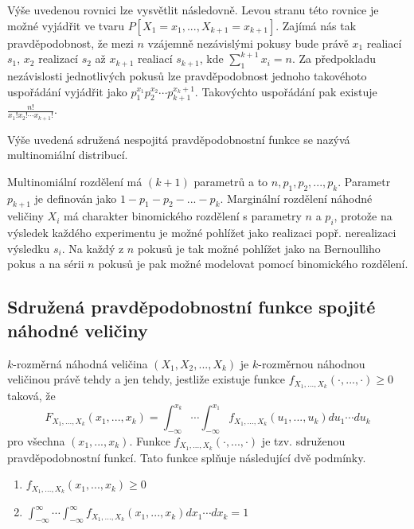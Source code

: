 Výše uvedenou rovnici lze vysvětlit následovně. Levou stranu této rovnice je možné vyjádřit ve tvaru $P[X_1 = x_1, ..., X_{k + 1} = x_{k + 1}]$. Zajímá nás tak pravděpodobnost, že mezi $n$ vzájemně nezávislými pokusy bude právě $x_1$ realiací $s_1$,  $x_2$ realizací $s_2$ až $x_{k + 1}$ realiací $s_{k + 1}$, kde $\sum_1^{k+1}x_i = n$. Za předpokladu nezávislosti jednotlivých pokusů lze pravděpodobnost jednoho takovéhoto uspořádání vyjádřit jako $p_1^{x_1}p_2^{x_2} \cdots p_{k+1}^{x_k + 1}$. Takovýchto uspořádání pak existuje $\frac{n!}{x_1!x_2! \cdots x_{k+1}!}$.

\begin{definition}
Výše uvedená sdružená nespojitá pravděpodobnostní funkce se nazývá multinomiální distribucí.
\end{definition}

Multinomiální rozdělení má $(k + 1)$ parametrů a to $n, p_1, p_2, ..., p_k$. Parametr $p_{k+1}$ je definován jako $1 - p_1 - p_2 - ... - p_k$. Marginální rozdělení náhodné veličiny $X_i$ má charakter binomického rozdělení s parametry $n$ a $p_i$, protože na výsledek každého experimentu je možné pohlížet jako realizaci popř. nerealizaci výsledku $s_i$. Na každý z $n$ pokusů je tak možné pohlížet jako na Bernoulliho pokus a na sérii $n$ pokusů je pak možné modelovat pomocí binomického rozdělení.

\subsection{Sdružená pravděpodobnostní funkce spojité náhodné veličiny}

\begin{definition}
$k$-rozměrná náhodná veličina $(X_1, X_2, ..., X_k)$ je $k$-rozměrnou náhodnou veličinou právě tehdy a jen tehdy, jestliže existuje funkce $f_{X_1, ..., X_k}(\cdot, ..., \cdot) \ge 0$ taková, že
\begin{equation*}
F_{X_1, ..., X_k}(x_1, ..., x_k) = \int_{-\infty}^{x_k} \cdots \int_{-\infty}^{x_1} f_{X_1, ..., X_k}(u_1, ..., u_k)du_1 \cdots du_k
\end{equation*}
pro všechna $(x_1, ..., x_k)$. Funkce $f_{X_1, ..., X_k}(\cdot, ..., \cdot)$ je tzv. sdruženou pravděpodobnostní funkcí. Tato funkce splňuje následující dvě podmínky.
\begin{enumerate}
\item $f_{X_1, ..., X_k}(x_1, ..., x_k) \ge 0$
\item $\int_{-\infty}^{\infty} \cdots \int_{-\infty}^{\infty} f_{X_1, ..., X_k}(x_1, ..., x_k)dx_1 \cdots dx_k = 1$
\end{enumerate}
\end{definition}

